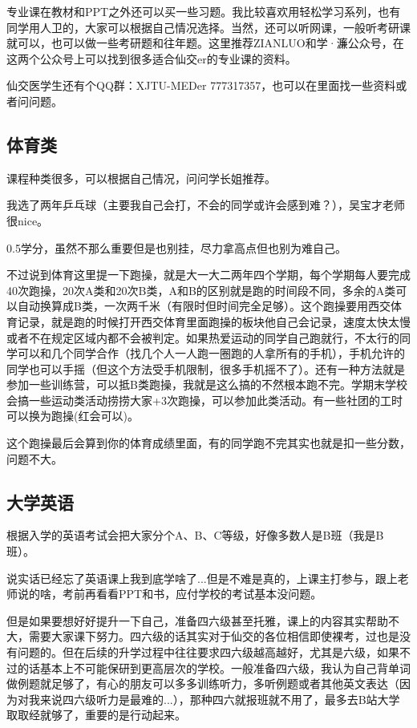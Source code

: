 \documentclass[zihao=-4,fontset=none]{Beautybook-CN}
\begin{document}
专业课在教材和PPT之外还可以买一些习题。我比较喜欢用轻松学习系列，也有同学用人卫的，大家可以根据自己情况选择。当然，还可以听网课，一般听考研课就可以，也可以做一些考研题和往年题。这里推荐ZIANLUO和学·濂公众号，在这两个公众号上可以找到很多适合仙交er的专业课的资料。

仙交医学生还有个QQ群：XJTU-MEDer 777317357，也可以在里面找一些资料或者问问题。

\subsection{体育类}

课程种类很多，可以根据自己情况，问问学长姐推荐。

我选了两年乒乓球（主要我自己会打，不会的同学或许会感到难？），吴宝才老师很nice。

0.5学分，虽然不那么重要但是也别挂，尽力拿高点但也别为难自己。

不过说到体育这里提一下跑操，就是大一大二两年四个学期，每个学期每人要完成40次跑操，20次A类和20次B类，A和B的区别就是跑的时间段不同，多余的A类可以自动换算成B类，一次两千米（有限时但时间完全足够）。这个跑操要用西交体育记录，就是跑的时候打开西交体育里面跑操的板块他自己会记录，速度太快太慢或者不在规定区域内都不会被判定。如果热爱运动的同学自己跑就行，不太行的同学可以和几个同学合作（找几个人一人跑一圈跑的人拿所有的手机），手机允许的同学也可以手摇（但这个方法受手机限制，很多手机摇不了）。还有一种方法就是参加一些训练营，可以抵B类跑操，我就是这么搞的不然根本跑不完。学期末学校会搞一些运动类活动捞捞大家+3次跑操，可以参加此类活动。有一些社团的工时可以换为跑操(红会可以)。

这个跑操最后会算到你的体育成绩里面，有的同学跑不完其实也就是扣一些分数，问题不大。

\subsection{大学英语}

根据入学的英语考试会把大家分个A、B、C等级，好像多数人是B班（我是B班）。

说实话已经忘了英语课上我到底学啥了...但是不难是真的，上课主打参与，跟上老师说的啥，考前再看看PPT和书，应付学校的考试基本没问题。

但是如果要想好好提升一下自己，准备四六级甚至托雅，课上的内容其实帮助不大，需要大家课下努力。四六级的话其实对于仙交的各位相信即使裸考，过也是没有问题的。但在后续的升学过程中往往要求四六级越高越好，尤其是六级，如果不过的话基本上不可能保研到更高层次的学校。一般准备四六级，我认为自己背单词做例题就足够了，有心的朋友可以多多训练听力，多听例题或者其他英文表达（因为对我来说四六级听力是最难的...），那种四六就报班就不用了，最多去B站大学取取经就够了，重要的是行动起来。
\end{document}

